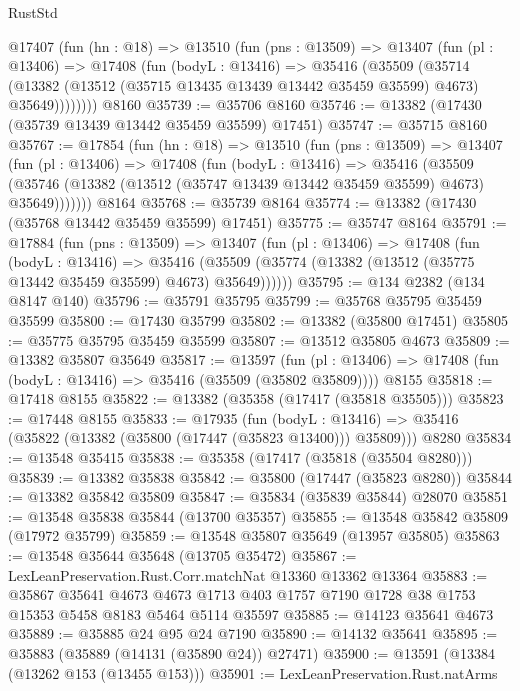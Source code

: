 \begin{lexlean}{RustStd}
\begin{coremodule}
    @17407
      (fun (hn : @18) =>
      @13510
        (fun (pns : @13509) =>
        @13407
          (fun (pl : @13406) =>
          @17408
            (fun (bodyL : @13416) =>
            @35416
              (@35509
                (@35714
                  (@13382 (@13512 (@35715 @13435 @13439 @13442 @35459 @35599) @4673) @35649))))))))
    @8160
@35739 := @35706 @8160
@35746 := @13382 (@17430 (@35739 @13439 @13442 @35459 @35599) @17451)
@35747 := @35715 @8160
@35767 := @17854
    (fun (hn : @18) =>
    @13510
      (fun (pns : @13509) =>
      @13407
        (fun (pl : @13406) =>
        @17408
          (fun (bodyL : @13416) =>
          @35416
            (@35509
              (@35746 (@13382 (@13512 (@35747 @13439 @13442 @35459 @35599) @4673) @35649)))))))
    @8164
@35768 := @35739 @8164
@35774 := @13382 (@17430 (@35768 @13442 @35459 @35599) @17451)
@35775 := @35747 @8164
@35791 := @17884
    (fun (pns : @13509) =>
    @13407
      (fun (pl : @13406) =>
      @17408
        (fun (bodyL : @13416) =>
        @35416 (@35509 (@35774 (@13382 (@13512 (@35775 @13442 @35459 @35599) @4673) @35649))))))
@35795 := @134 @2382 (@134 @8147 @140)
@35796 := @35791 @35795
@35799 := @35768 @35795 @35459 @35599
@35800 := @17430 @35799
@35802 := @13382 (@35800 @17451)
@35805 := @35775 @35795 @35459 @35599
@35807 := @13512 @35805 @4673
@35809 := @13382 @35807 @35649
@35817 := @13597
    (fun (pl : @13406) => @17408 (fun (bodyL : @13416) => @35416 (@35509 (@35802 @35809))))
    @8155
@35818 := @17418 @8155
@35822 := @13382 (@35358 (@17417 (@35818 @35505)))
@35823 := @17448 @8155
@35833 := @17935
    (fun (bodyL : @13416) => @35416 (@35822 (@13382 (@35800 (@17447 (@35823 @13400))) @35809)))
    @8280
@35834 := @13548 @35415
@35838 := @35358 (@17417 (@35818 (@35504 @8280)))
@35839 := @13382 @35838
@35842 := @35800 (@17447 (@35823 @8280))
@35844 := @13382 @35842 @35809
@35847 := @35834 (@35839 @35844) @28070
@35851 := @13548 @35838 @35844 (@13700 @35357)
@35855 := @13548 @35842 @35809 (@17972 @35799)
@35859 := @13548 @35807 @35649 (@13957 @35805)
@35863 := @13548 @35644 @35648 (@13705 @35472)
@35867 := LexLeanPreservation.Rust.Corr.matchNat @13360 @13362 @13364
@35883 := @35867
    @35641
    @4673
    @4673
    @1713
    @403
    @1757
    @7190
    @1728
    @38
    @1753
    @15353
    @5458
    @8183
    @5464
    @5114
    @35597
@35885 := @14123 @35641 @4673
@35889 := @35885 @24 @95 @24 @7190
@35890 := @14132 @35641
@35895 := @35883 (@35889 (@14131 (@35890 @24)) @27471)
@35900 := @13591 (@13384 (@13262 @153 (@13455 @153)))
@35901 := LexLeanPreservation.Rust.natArms

\end{coremodule}
\end{lexlean}
